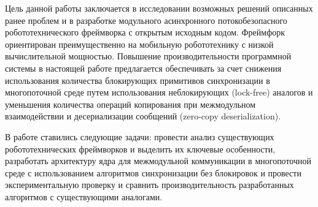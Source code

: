 Цель данной работы заключается в исследовании возможных решений 
описанных ранее проблем и в разработке модульного асинхронного 
потокобезопасного робототехнического фреймворка с открытым 
исходным кодом. Фреймфорк ориентирован преимущественно на 
мобильную робототехнику с низкой вычислительной мощностью. 
Повышение производительности программной системы в настоящей 
работе предлагается обеспечивать за счет снижения использования 
количества блокирующих примитивов синхронизации в многопоточной 
среде путем использования неблокирующих (lock-free) аналогов и 
уменьшения количества операций копирования при межмодульном 
взаимодействии и десериализации сообщений (zero-copy 
deserialization).

В работе ставились следующие задачи: провести анализ 
существующих робототехнических фреймворков и выделить их 
ключевые особенности, разработать архитектуру ядра для 
межмодульной коммуникации в многопоточной среде с использованием 
алгоритмов синхронизации без блокировок и провести 
экспериментальную проверку и сравнить производительность 
разработанных алгоритмов с существующими аналогами.